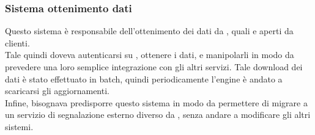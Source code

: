         \subsubsection{Sistema ottenimento dati}
            Questo sistema è responsabile dell'ottenimento dei dati da , quali  e  aperti da clienti. \\
            Tale quindi doveva autenticarsi su , ottenere i dati, e manipolarli in modo da prevedere una loro semplice integrazione con gli altri servizi.
            Tale download dei dati è stato effettuato in batch, quindi periodicamente l'engine è andato a scaricarsi gli aggiornamenti. \\
             Infine, bisognava predisporre questo sistema in modo da permettere di migrare a un servizio di segnalazione esterno diverso da , senza andare a modificare gli altri sistemi.
